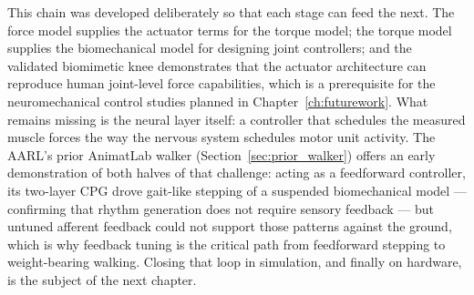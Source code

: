 This chain was developed deliberately so that each stage can feed the next. The force model supplies the actuator terms for the torque model; the torque model supplies the biomechanical model for designing joint controllers; and the validated biomimetic knee demonstrates that the actuator architecture can reproduce human joint-level force capabilities, which is a prerequisite for the neuromechanical control studies planned in Chapter~\ref{ch:futurework}. What remains missing is the neural layer itself: a controller that schedules the measured muscle forces the way the nervous system schedules motor unit activity. The AARL's prior AnimatLab walker (Section~\ref{sec:prior_walker}) offers an early demonstration of both halves of that challenge: acting as a feedforward controller, its two-layer CPG drove gait-like stepping of a suspended biomechanical model --- confirming that rhythm generation does not require sensory feedback --- but untuned afferent feedback could not support those patterns against the ground, which is why feedback tuning is the critical path from feedforward stepping to weight-bearing walking. Closing that loop in simulation, and finally on hardware, is the subject of the next chapter.

